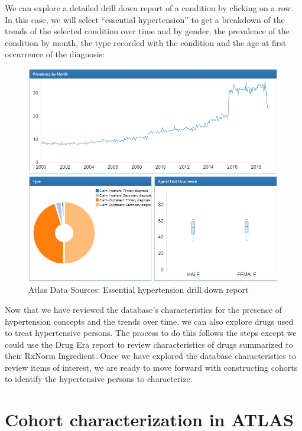 \documentclass[11pt]{book}
\theoremstyle{definition}
\theoremstyle{definition}
\theoremstyle{definition}
\theoremstyle{remark}
\begin{document}
We can explore a detailed drill down report of a condition by clicking on a row. In this case, we will select ``essential hypertension'' to get a breakdown of the trends of the selected condition over time and by gender, the prevalence of the condition by month, the type recorded with the condition and the age at first occurrence of the diagnosis:

\begin{figure}

{\centering \includegraphics[width=1\linewidth]{images/Characterization/atlasDataSourcesDrillDownReport} 

}

\caption{Atlas Data Sources: Essential hypertension drill down report}\label{fig:atlasDataSourcesDrillDownReport}
\end{figure}

Now that we have reviewed the database's characteristics for the presence of hypertension concepts and the trends over time, we can also explore drugs used to treat hypertensive persons. The process to do this follows the steps except we could use the Drug Era report to review characteristics of drugs summarized to their RxNorm Ingredient. Once we have explored the database characteristics to review items of interest, we are ready to move forward with constructing cohorts to identify the hypertensive persons to characterize.

\hypertarget{cohort-characterization-in-atlas}{%
\section{Cohort characterization in ATLAS}\label{cohort-characterization-in-atlas}}
\end{document}
